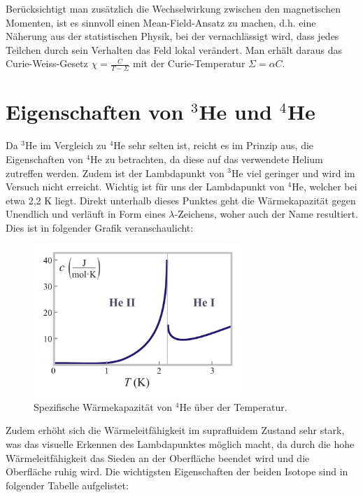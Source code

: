 \documentclass[bigchapter,colorback,accentcolor=tud4b,linedtoc,11pt]{tudreport}
\begin{document}
Berücksichtigt man zusätzlich die Wechselwirkung zwischen den magnetischen Momenten, ist es sinnvoll einen Mean-Field-Ansatz zu machen, d.h. eine Näherung aus der statistischen Physik, bei der vernachlässigt wird, dass jedes Teilchen durch sein Verhalten das Feld lokal verändert. Man erhält daraus das Curie-Weiss-Gesetz $\chi = \frac{C}{T- \Sigma}$ mit der Curie-Temperatur $\Sigma = \alpha C$.

\section{Eigenschaften von $^3$He und $^4$He}

Da $^3$He im Vergleich zu $^4$He sehr selten ist, reicht es im Prinzip aus, die Eigenschaften von $^4$He zu betrachten, da diese auf das verwendete Helium zutreffen werden. Zudem ist der Lambdapunkt von $^3$He viel geringer und wird im Versuch nicht erreicht. Wichtig ist für uns der Lambdapunkt von $^4$He, welcher bei etwa 2,2 K liegt. Direkt unterhalb dieses Punktes geht die Wärmekapazität gegen Unendlich und verläuft in Form eines $\lambda$-Zeichens, woher auch der Name resultiert. Dies ist in folgender Grafik veranschaulicht: 

\begin{figure}[h] 
  \centering
     \includegraphics[width=0.7\textwidth]{data/lambda.jpg}
  \caption{Spezifische Wärmekapazität von $^4$He über der Temperatur. \cite{wiki}}  
  \label{fig:Bild1}
\end{figure}

Zudem erhöht sich die Wärmeleitfähigkeit im suprafluidem Zustand sehr stark, was das visuelle Erkennen des Lambdapunktes möglich macht, da durch die hohe Wärmeleitfähigkeit das Sieden an der Oberfläche beendet wird und die Oberfläche ruhig wird. Die wichtigsten Eigenschaften der beiden Isotope sind in folgender Tabelle aufgelistet: 
\end{document}
